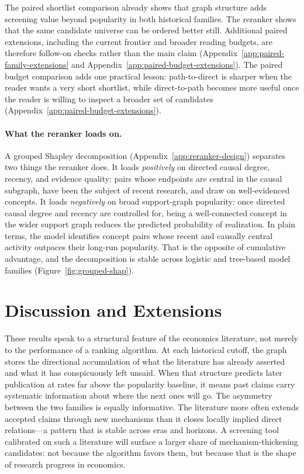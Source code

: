\documentclass[11pt]{article}
\begin{document}
The paired shortlist comparison already shows that graph structure adds screening value
beyond popularity in both historical families. The reranker shows that the same candidate
universe can be ordered better still. Additional paired extensions, including the current
frontier and broader reading budgets, are therefore follow-on checks rather than the main
claim (Appendix~\ref{app:paired-family-extensions} and
Appendix~\ref{app:paired-budget-extensions}). The paired budget comparison adds one
practical lesson: path-to-direct is sharper when the reader wants a very short shortlist,
while direct-to-path becomes more useful once the reader is willing to inspect a broader
set of candidates (Appendix~\ref{app:paired-budget-extensions}).

\paragraph{What the reranker loads on.}
A grouped Shapley decomposition (Appendix~\ref{app:reranker-design}) separates two things the reranker does. It loads \emph{positively} on directed causal degree, recency, and evidence quality: pairs whose endpoints are central in the causal subgraph, have been the subject of recent research, and draw on well-evidenced concepts. It loads \emph{negatively} on broad support-graph popularity: once directed causal degree and recency are controlled for, being a well-connected concept in the wider support graph reduces the predicted probability of realization. In plain terms, the model identifies concept pairs whose recent and causally central activity outpaces their long-run popularity. That is the opposite of cumulative advantage, and the decomposition is stable across logistic and tree-based model families (Figure~\ref{fig:grouped-shap}).

\section{Discussion and Extensions}
\label{sec:discussion}

These results speak to a structural feature of the economics literature, not merely to the
performance of a ranking algorithm. At each historical cutoff, the graph stores the
directional accumulation of what the literature has already asserted and what it has
conspicuously left unsaid. When that structure predicts later publication at rates far above
the popularity baseline, it means past claims carry systematic information about where the
next ones will go. The asymmetry between the two families is equally informative. The
literature more often extends accepted claims through new mechanisms than it closes locally
implied direct relations---a pattern that is stable across eras and horizons. A screening
tool calibrated on such a literature will surface a larger share of mechanism-thickening
candidates: not because the algorithm favors them, but because that is the shape of
research progress in economics.
\end{document}

